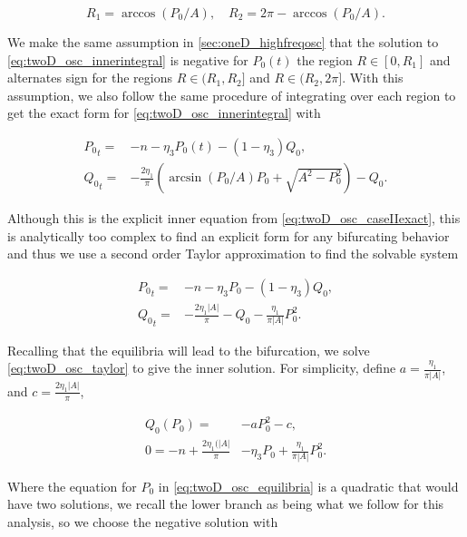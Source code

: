 \begin{equation*}
R_1=\arccos(P_0/A),\quad R_2=2\pi-\arccos(P_0/A).
\end{equation*}

We make the same assumption in \autoref{sec:oneD_highfreqosc} that the solution to \eqref{eq:twoD_osc_innerintegral} is negative for $P_0(t)$ the region $R\in[0,R_1]$ and alternates sign for the regions $R\in (R_1,R_2]$ and $R\in (R_2,2\pi]$. With this assumption, we also follow the same procedure of integrating over each region to get the exact form for \eqref{eq:twoD_osc_innerintegral} with

\begin{equation}\label{eq:twoD_osc_caseIIexact}
\begin{aligned}
{P_0}_t=&-n- \eta_3 P_0(t)-(1-\eta_3)Q_0,\\
{Q_0}_t=&-\frac{2\eta_1}{\pi}\left(\arcsin(P_0/A)P_0+\sqrt{A^2-P_0^2}\right)-Q_0.
\end{aligned}
\end{equation}

Although this is the explicit inner equation from \eqref{eq:twoD_osc_caseIIexact}, this is analytically too complex to find an explicit form for any bifurcating behavior and thus we use a second order Taylor approximation to find the solvable system

\begin{equation}\label{eq:twoD_osc_taylor}
\begin{aligned}
{P_0}_t=&-n -\eta_3 P_0-(1-\eta_3)Q_0,\\
{Q_0}_t=&-\frac{2\eta_1|A|}{\pi}-Q_0-\frac{\eta_1}{\pi|A|}P_0^2.
\end{aligned}
\end{equation}

Recalling that the equilibria will lead to the bifurcation, we solve \eqref{eq:twoD_osc_taylor} to give the inner solution. For simplicity, define $a=\frac{\eta_1}{\pi|A|}$, and $ c=\frac{2\eta_1|A|}{\pi}$,

\begin{equation}\label{eq:twoD_osc_equilibria}
\begin{aligned}
Q_0(P_0)=&-aP_0^2-c,\\
0=-n+\frac{2\eta_1(|A|}{\pi}&-\eta_3 P_0+\frac{\eta_1}{\pi |A|}P_0^2.
\end{aligned}
\end{equation}

Where the equation for $P_0$ in \eqref{eq:twoD_osc_equilibria} is a quadratic that would have two solutions, we recall the lower branch as being what we follow for this analysis, so we choose the negative solution with


